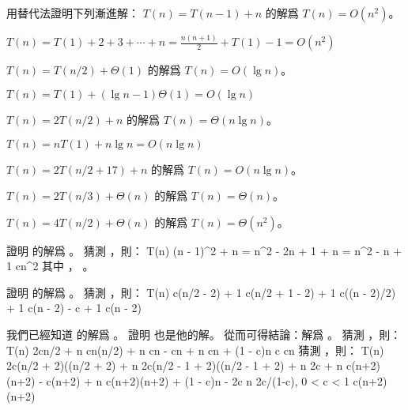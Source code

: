\startsection[
  title={The substitution method for solving recurrences},
]

\startEXERCISE
用替代法證明下列漸進解：
\startigBase[a]
\startitem
$T(n)=T(n-1)+n$ 的解爲 $T(n)=O(n^2)$。

\startANSWER
$T(n)=T(1)+2+3+\cdots+n=\frac{n(n+1)}{2}+T(1)-1=O(n^2)$
\stopANSWER
\stopitem

\startitem
$T(n)=T(n/2)+\Theta(1)$ 的解爲 $T(n)=O(\lg n)$。

\startANSWER
$T(n)=T(1)+(\lg n - 1)\Theta(1)=O(\lg n)$
\stopANSWER
\stopitem

\startitem
$T(n)=2T(n/2)+n$ 的解爲 $T(n)=\Theta(n\lg n)$。

\startANSWER
$T(n)=n T(1)+n\lg n=O(n\lg n)$
\stopANSWER
\stopitem

\startitem
$T(n)=2T(n/2+17)+n$ 的解爲 $T(n)=O(n\lg n)$。

\startANSWER
{}
\stopANSWER
\stopitem

\startitem
$T(n)=2T(n/3)+\Theta(n)$ 的解爲 $T(n)=\Theta(n)$。

\startANSWER
{}
\stopANSWER
\stopitem

\startitem
$T(n)=4T(n/2)+\Theta(n)$ 的解爲 $T(n)=\Theta(n^2)$。

\startANSWER
{}
\stopANSWER
\stopitem

\stopigBase
\stopEXERCISE

\startEXERCISE
證明  的解爲 。
\stopEXERCISE
\startANSWER
猜測 ，則：
\startformula\startalign
\NC T(n) \NC \leq (n - 1)^2 + n \NR
\NC      \NC = n^2 - 2n + 1 + n \NR
\NC      \NC = n^2 - n + 1 \NR
\NC      \NC \leq cn^2 \NR
\stopalign\stopformula
其中 ， 。
\stopANSWER

\startEXERCISE
證明  的解爲 。
\stopEXERCISE
\startANSWER
猜測 ，則：
\startformula\startalign
\NC T(n) \NC \le c\lg(\lceil n/2 \rceil - 2) + 1 \NR
\NC      \NC \le c\lg(n/2 + 1 - 2) + 1 \NR
\NC      \NC \le c\lg((n - 2)/2) + 1 \NR
\NC      \NC \le c\lg(n - 2) - c + 1 \NR
\NC      \NC \le c\lg(n - 2) \NR
\stopalign\stopformula
\stopANSWER

\startEXERCISE
我們已經知道  的解爲 。
證明  也是他的解。
從而可得結論：解爲 。
\stopEXERCISE
\startANSWER
猜測 ，則：
\startformula\startalign
\NC T(n) \NC \le 2c\lfloor n/2 \rfloor{} + n \NR
\NC      \NC \le cn\lg(n/2) + n \NR
\NC      \NC \le cn - cn + n \NR
\NC      \NC \le cn + (1 - c)n \qquad {} c  \NR
\NC      \NC \le cn \NR
\stopalign\stopformula
猜測 ，則：
\startformula\startalign
\NC T(n) \NC \ge 2c(\lfloor n/2 \rfloor + 2)(\lg(\lfloor n/2 \rfloor + 2) + n \NR
\NC      \NC \ge 2c(n/2 - 1 + 2)(\lg(n/2 - 1 + 2) + n \NR
\NC      \NC \ge 2c\lg{} + n \NR
\NC      \NC \ge c(n+2)\lg(n+2) - c(n+2) + n \NR
\NC      \NC \ge c(n+2)\lg(n+2) + (1 - c)n - 2c \qquad {} n \ge 2c/(1-c), 0 < c < 1 \NR
\NC      \NC \ge c(n+2)\lg(n+2) \NR
\stopalign\stopformula
\stopANSWER

